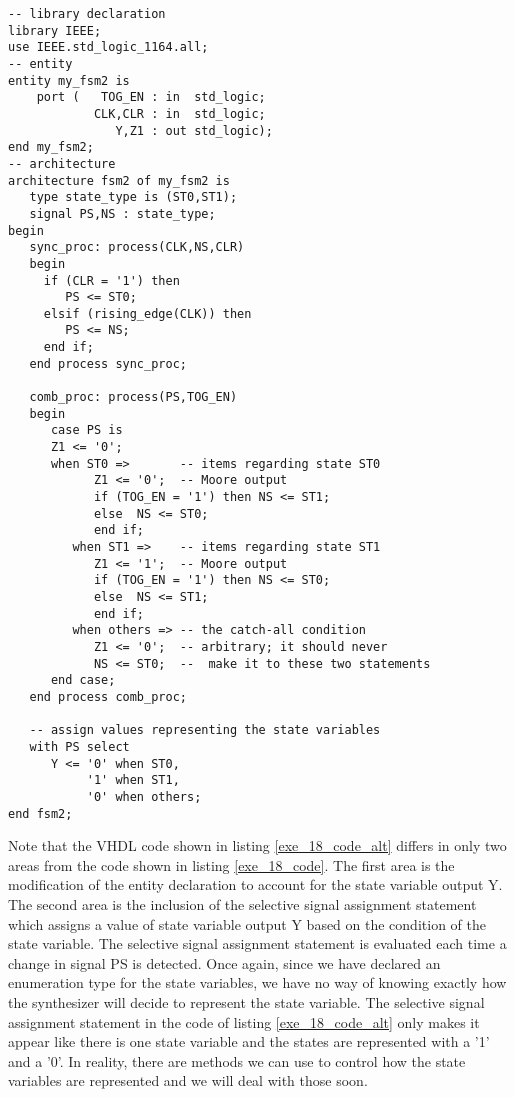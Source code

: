 \noindent
\begin{minipage}{0.99\linewidth}
\begin{lstlisting}[label=exe_18_code_alt, caption=Solution to Example 18 that include state variable as output.]
-- library declaration
library IEEE;
use IEEE.std_logic_1164.all;
-- entity
entity my_fsm2 is 
    port (   TOG_EN : in  std_logic; 
            CLK,CLR : in  std_logic; 
               Y,Z1 : out std_logic); 
end my_fsm2;
-- architecture
architecture fsm2 of my_fsm2 is
   type state_type is (ST0,ST1); 
   signal PS,NS : state_type; 
begin
   sync_proc: process(CLK,NS,CLR)
   begin
     if (CLR = '1') then 
        PS <= ST0; 
     elsif (rising_edge(CLK)) then 
        PS <= NS; 
     end if; 
   end process sync_proc; 

   comb_proc: process(PS,TOG_EN)
   begin
      case PS is 
      Z1 <= '0';    
      when ST0 =>       -- items regarding state ST0
            Z1 <= '0';  -- Moore output
            if (TOG_EN = '1') then NS <= ST1; 
            else  NS <= ST0; 
            end if; 
         when ST1 =>    -- items regarding state ST1
            Z1 <= '1';  -- Moore output
            if (TOG_EN = '1') then NS <= ST0; 
            else  NS <= ST1; 
            end if; 
         when others => -- the catch-all condition
            Z1 <= '0';  -- arbitrary; it should never 
            NS <= ST0;  --  make it to these two statements
      end case; 
   end process comb_proc; 
 
   -- assign values representing the state variables
   with PS select
      Y <= '0' when ST0, 
           '1' when ST1, 
           '0' when others; 
end fsm2;
\end{lstlisting}
\end{minipage}

Note that the VHDL code shown in listing \ref{exe_18_code_alt} differs in only two areas from the code shown in listing \ref{exe_18_code}. The first area is the modification of the entity declaration to account for the state variable output Y. The second area is the inclusion of the selective signal assignment statement which assigns a value of state variable output Y based on the condition of the state variable. The selective signal assignment statement is evaluated each time a change in signal PS is detected. Once again, since we have declared an enumeration type for the state variables, we have no way of knowing exactly how the synthesizer will decide to represent the state variable. The selective signal assignment statement in the code of listing \ref{exe_18_code_alt} only makes it appear like there is one state variable and the states are represented with a '1' and a '0'. In reality, there are methods we can use to control how the state variables are represented and we will deal with those soon. 

